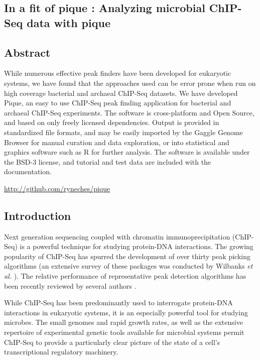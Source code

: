 \begin{refsection}

\chapter{In a fit of pique : Analyzing microbial ChIP-Seq data with pique}


\section{Abstract}

While numerous effective peak finders have been developed
for eukaryotic systems, we have found that the approaches used can be
error prone when run on high coverage bacterial and archaeal ChIP-Seq
datasets. We have developed Pique, an easy to use ChIP-Seq peak
finding application for bacterial and archaeal ChIP-Seq experiments.
The software is cross-platform and Open Source, and based on only
freely licensed dependencies. Output is provided in standardized file
formats, and may be easily imported by the Gaggle Genome Browser
\cite{gaggle_browser} for manual curation and data exploration, or
into statistical and graphics software such as R \cite{R} for further
analysis. The software is available under the BSD-3 license, and tutorial
and test data are included with the documentation.

\url{http://github.com/ryneches/pique}

\section{Introduction}

Next generation sequencing coupled with chromatin
immuno\-pre\-cipi\-tation (ChIP-Seq) is a powerful technique for
studying protein-DNA interactions. The growing popularity of ChIP-Seq
has spurred the development of over thirty peak picking algorithms (an
extensive survey of these packages was conducted by Wilbanks {\em et
  al.} \cite{wilbanks}). The relative performance of representative
peak detection algorithms has been recently reviewed by several
authors \cite{Pepke, Laajala_review, too_many_peak_callers,
  peakranger, peak_benchmark}.

While ChIP-Seq has been predominantly used to interrogate protein-DNA
interactions in eukaryotic systems, it is an especially powerful tool
for studying microbes. The small genomes and rapid growth rates, as
well as the extensive repertoire of experimental genetic tools
available for microbial systems permit ChIP-Seq to provide a
particularly clear picture of the state of a cell's transcriptional
regulatory machinery.


\end{refsection}
